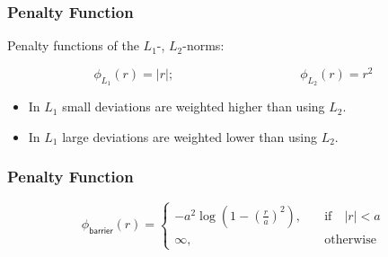 \begin{frame}
  \frametitle{Penalty Function \cont}

  Penalty functions of the $L_1$-,  $L_2$-norms:

  \begin{displaymath}
    \phi_{L_1}(r) = |r|;  \qquad \qquad \qquad \qquad \qquad \phi_{L_2}(r) = r^2
  \end{displaymath}
  \pause
  
  \vspace{-0.5cm}
  \begin{figure}
    \resizebox{.4\linewidth}{!}{
       
    }
    \hspace{1cm}
    \resizebox{.4\linewidth}{!}{
       
    }
  \end{figure}

  \begin{itemize}
    \item In $L_1$ small deviations are weighted higher than using $L_2$.
    \item In $L_1$ large deviations are weighted lower than using $L_2$.
  \end{itemize}
\end{frame}


\begin{frame}
  \frametitle{Penalty Function \cont}


  \begin{displaymath}
    \phi_\mathsf{barrier}(r) = 
      \left\{
        \begin{array}{cl}
          -a^2\log \left(1-\left( \frac{r}{a}\right)^2 \right),  & \quad \mbox{if} \quad |r| < a\\
          \infty,                                                & \quad \mbox{otherwise}
        \end{array}
      \right.
  \end{displaymath}     

  \begin{figure}
  \end{figure}
\end{frame}


